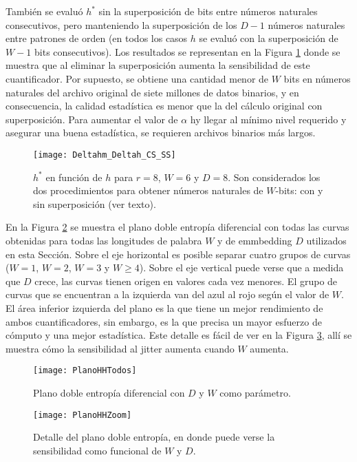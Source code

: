 También se evaluó $h^*$ sin la superposición de bits entre números naturales consecutivos, pero manteniendo la superposición de los $D-1$ números naturales entre patrones de orden (en todos los casos $h$ se evaluó con la superposición de $W-1$ bits consecutivos).
Los resultados se representan en la Figura \ref{fig:Deltahm_Deltah_CS_SS} donde se muestra que al eliminar la superposición aumenta la sensibilidad de este cuantificador.
Por supuesto, se obtiene una cantidad menor de $W$ bits en números naturales del archivo original de siete millones de datos binarios, y en consecuencia, la calidad estadística es menor que la del cálculo original con superposición.
Para aumentar el valor de $\alpha$ hy llegar al mínimo nivel requerido y asegurar una buena estadística, se requieren archivos binarios más largos.
%
\begin{figure}
\centering
\texttt{[image: Deltahm\_Deltah\_CS\_SS]}
\caption{$h^*$ en función de $h$ para $r=8$, $W=6$ y $D=8$. Son considerados los dos procedimientos para obtener números naturales de $W$-bits: con y sin superposición (ver texto).}
\label{fig:Deltahm_Deltah_CS_SS}
\end{figure}

En la Figura \ref{fig:PlanoHHTodos} se muestra el plano doble entropía diferencial con todas las curvas obtenidas para todas las longitudes de palabra $W$ y de emmbedding $D$ utilizados en esta Sección.
Sobre el eje horizontal es posible separar cuatro grupos de curvas ($W = 1$, $W = 2$, $W = 3$ y $W \geq 4$).
Sobre el eje vertical puede verse que a medida que $D$ crece, las curvas tienen origen en valores cada vez menores.
El grupo de curvas que se encuentran a la izquierda van del azul al rojo según el valor de $W$.
El área inferior izquierda del plano es la que tiene un mejor rendimiento de ambos cuantificadores, sin embargo, es la que precisa un mayor esfuerzo de cómputo y una mejor estadística.
Este detalle es fácil de ver en la Figura \ref{fig:PlanoHHZoom}, allí se muestra cómo la sensibilidad al jitter aumenta cuando $W$ aumenta.
%
\begin{figure}
	\centering
	\texttt{[image: PlanoHHTodos]}
	\caption{Plano doble entropía diferencial con $D$ y $W$ como parámetro.}
	\label{fig:PlanoHHTodos}
\end{figure}
%
\begin{figure}
	\centering
	\texttt{[image: PlanoHHZoom]}
	\caption{Detalle del plano doble entropía, en donde puede verse la sensibilidad como funcional de $W$ y $D$.}
	\label{fig:PlanoHHZoom}
\end{figure}
%
